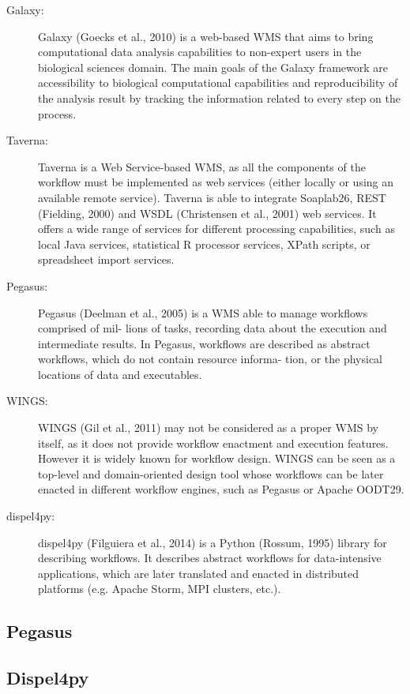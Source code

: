\begin{description}
	\item [Galaxy:] Galaxy (Goecks et al., 2010) is a web-based WMS that aims to bring computational data analysis capabilities to non-expert users in the biological sciences domain. The main goals of the Galaxy framework are accessibility to biological computational capabilities and reproducibility of the analysis result by tracking the information related to every step on the process. 
	\item [Taverna: ] Taverna is a Web Service-based WMS, as all the components of the workflow must be implemented as web services (either locally or using an available remote service). Taverna is able to integrate Soaplab26, REST (Fielding, 2000) and WSDL (Christensen et al., 2001) web services. It offers a wide range of services for different processing capabilities, such as local Java services, statistical R processor services, XPath scripts, or spreadsheet import services.
	\item [Pegasus:] Pegasus (Deelman et al., 2005) is a WMS able to manage workflows comprised of mil- lions of tasks, recording data about the execution and intermediate results. In Pegasus, workflows are described as abstract workflows, which do not contain resource informa- tion, or the physical locations of data and executables.
	\item [WINGS:] WINGS (Gil et al., 2011) may not be considered as a proper WMS by itself, as it does not provide workflow enactment and execution features. However it is widely known for workflow design. WINGS can be seen as a top-level and domain-oriented design tool whose workflows can be later enacted in different workflow engines, such as Pegasus or Apache OODT29.
	\item [dispel4py:] dispel4py (Filguiera et al., 2014) is a Python (Rossum, 1995) library for describing workflows. It describes abstract workflows for data-intensive applications, which are later translated and enacted in distributed platforms (e.g. Apache Storm, MPI clusters, etc.).

\end{description} 

\subsection{Pegasus}

\subsection{Dispel4py}

